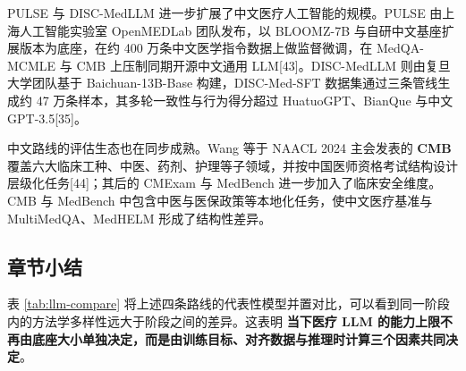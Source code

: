 PULSE 与 DISC-MedLLM 进一步扩展了中文医疗人工智能的规模。PULSE 由上海人工智能实验室 OpenMEDLab 团队发布，以 BLOOMZ-7B 与自研中文基座扩展版本为底座，在约 400 万条中文医学指令数据上做监督微调，在 MedQA-MCMLE 与 CMB 上压制同期开源中文通用 LLM[43]。DISC-MedLLM 则由复旦大学团队基于 Baichuan-13B-Base 构建，DISC-Med-SFT 数据集通过三条管线生成约 47 万条样本，其多轮一致性与行为得分超过 HuatuoGPT、BianQue 与中文 GPT-3.5[35]。

中文路线的评估生态也在同步成熟。Wang 等于 NAACL 2024 主会发表的 \textbf{CMB} 覆盖六大临床工种、中医、药剂、护理等子领域，并按中国医师资格考试结构设计层级化任务[44]；其后的 CMExam 与 MedBench 进一步加入了临床安全维度。CMB 与 MedBench 中包含中医与医保政策等本地化任务，使中文医疗基准与 MultiMedQA、MedHELM 形成了结构性差异。

\subsection{章节小结}

表 \ref{tab:llm-compare} 将上述四条路线的代表性模型并置对比，可以看到同一阶段内的方法学多样性远大于阶段之间的差异。这表明 \textbf{当下医疗 LLM 的能力上限不再由底座大小单独决定，而是由训练目标、对齐数据与推理时计算三个因素共同决定}。

